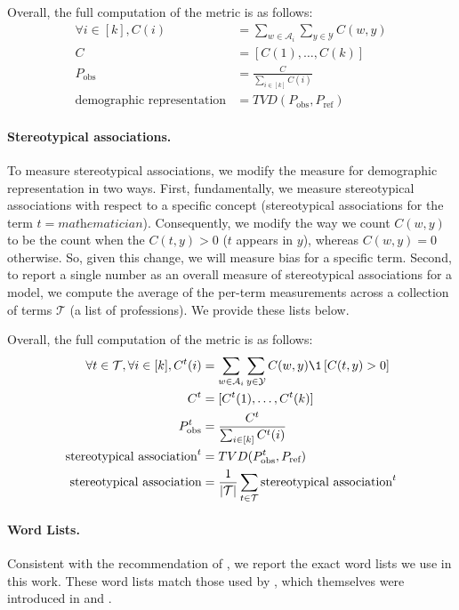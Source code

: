 Overall, the full computation of the metric is as follows:
\begin{align}
    \forall i \in [k], C(i) &= \sum_{w \in \mathcal{A}_i}\sum_{y \in \mathcal{Y}}C(w,y) \\
    C &= [C(1), \dots, C(k)] \\
    P_\text{obs} &= \frac{C}{\sum_{i \in [k]} C(i)} \\
    \mbox{demographic representation} &= TVD(P_\text{obs}, P_\text{ref})
\end{align}

\paragraph{Stereotypical associations.}
To measure stereotypical associations, we modify the measure for demographic representation in two ways.
First, fundamentally, we measure stereotypical associations with respect to a specific concept (\eg stereotypical associations for the term $t =  \textit{mathematician}$).
Consequently, we modify the way we count $C(w, y)$ to be the count when the $C(t, y) > 0$ (\ie $t$ appears in $y$), whereas $C(w, y) = 0$ otherwise.
So, given this change, we will measure bias for a specific term.
Second, to report a single number as an overall measure of stereotypical associations for a model, we compute the average of the per-term measurements across a collection of terms $\mathcal{T}$ (\eg a list of professions). 
We provide these lists below.

Overall, the full computation of the metric is as follows:
\begin{align}
    \forall t \in \mathcal{T}, \forall i \in [k], C^t(i) &= \sum_{w \in \mathcal{A}_i}\sum_{y \in \mathcal{Y}}C(w,y)\1\left[C(t, y) > 0 \right] \\
    C^t &= [C^t(1), \dots, C^t(k)] \\
    P^t_\text{obs} &= \frac{C^t}{\sum_{i \in [k]} C^t(i)} \\
    \mbox{stereotypical association}^t &= TVD(P^t_\text{obs}, P_\text{ref}) \\
    \mbox {stereotypical association} &= \frac{1}{|\mathcal{T}|}\sum_{t \in \mathcal{T}} \mbox{stereotypical association}^t
\end{align}

\paragraph{Word Lists.}
Consistent with the recommendation of \citet{antoniak2021seeds}, we report the exact word lists we use in this work.
These word lists match those used by \citet{bommasani2020interpreting}, which themselves were introduced in \citet{bolukbasi2016man} and \citet{garg2018stereotypes}. 

